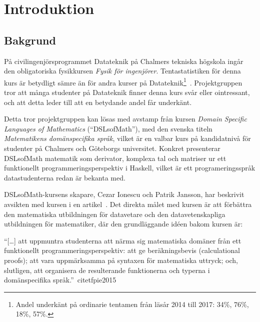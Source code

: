 
\chapter{Introduktion}

\begin{binge}
\end{binge}

\section{Bakgrund}

\begin{draft}

På civilingenjörsprogrammet Datateknik på Chalmers tekniska högskola ingår den obligatoriska
fysikkursen \textit{Fysik för ingenjörer}. Tentastatistiken för denna kurs är
betydligt sämre än för andra kurser på Datateknik\footnote{Andel underkänt på
ordinarie tentamen från läsår 2014 till 2017: 34\%, 76\%, 18\%, 57\%.
}~\cite{tentastatistik}. Projektgruppen tror att många studenter på Datateknik finner denna
kurs svår eller ointressant, och att detta leder till att en betydande andel får
underkänt.

Detta tror projektgruppen kan lösas med avstamp från kursen \textit{Domain
Specific Languages of Mathematics} (``DSLsofMath''), med den svenska titeln
\textit{Matematikens domänspecifika språk}, vilket är en valbar kurs på
kandidatnivå för studenter på Chalmers och Göteborgs universitet. Konkret
presenterar DSLsofMath matematik som derivator, komplexa tal och
matriser ur ett funktionellt programmeringsperspektiv i Haskell, vilket är ett programeringsspråk datastudenterna redan är bekanta med.

DSLsofMath-kursens skapare, Cezar Ionescu och Patrik Jansson, har beskrivit avsikten med kursen i en artikel~\cite{tfpie2015}. Det direkta målet med kursen är
att förbättra den matematiska utbildningen för datavetare och den
datavetenskapliga utbildningen för matematiker, där den grundläggande idéen
bakom kursen är:

\begin{center} ``[\dots] att uppmuntra studenterna att närma sig matematiska
  domäner från ett funktionellt programmeringsperspektiv: att ge beräkningsbevis
  (calculational proofs); att vara uppmärksamma på syntaxen för matematiska
  uttryck; och, slutligen, att organisera de resulterande funktionerna och
typerna i domänspecifika språk.''~cite{tfpie2015}~\cite{lecture-notes}\
\end{center}


\end{draft}
